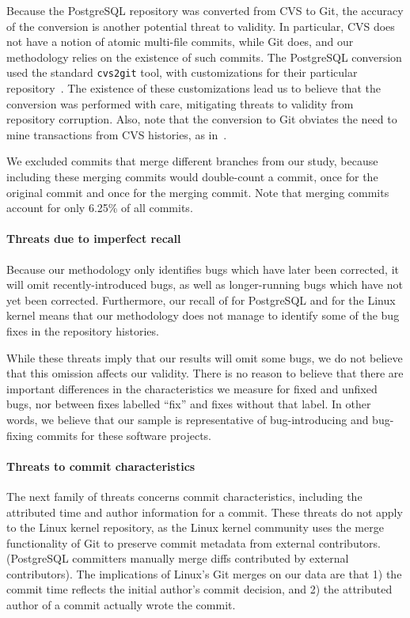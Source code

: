 Because the PostgreSQL repository was converted from CVS to Git, the accuracy of
the conversion is another potential threat to validity. In particular, CVS does
not have a notion of atomic multi-file commits, while Git does, and our
methodology relies on the existence of such commits. The PostgreSQL conversion
used the standard {\tt cvs2git} tool, with customizations for their particular
repository~\cite{haas09:_so_why_postg_using_git}. The existence of these
customizations lead us to believe
that the conversion was performed with care, mitigating threats to
validity from repository corruption. Also, note that the conversion to Git
obviates the need to mine transactions from CVS histories, as
in~\cite{zimmermann-msr-2004}.

We excluded commits that merge different branches from our study, because
including these merging commits would double-count a commit, once for the
original commit and once for the merging commit. Note that merging
commits account for only 6.25\% of all commits.

\paragraph{Threats due to imperfect recall}

Because our methodology only identifies bugs which have later been corrected, it
will omit recently-introduced bugs, as well as longer-running bugs
which have not yet been corrected. Furthermore, our recall of \postR for
PostgreSQL and \linuxR for the Linux kernel means that our methodology does not
manage to identify some of the bug fixes in the repository histories.

While these threats imply that our results will omit some bugs, we do not
believe that this omission affects our validity. There is no reason to believe
that there are important differences in the characteristics we measure for fixed
and unfixed bugs, nor between fixes labelled ``fix'' and fixes without that
label. In other words, we believe that our sample is representative of
bug-introducing and bug-fixing commits for these software projects.

\paragraph{Threats to commit characteristics}

The next family of threats concerns commit characteristics, including the
attributed time and author information for a commit. These threats do not apply
to the Linux kernel repository, as the Linux kernel community uses the merge
functionality of Git to preserve commit metadata from external
contributors. (PostgreSQL committers manually merge diffs
contributed by external contributors). The implications of Linux's Git merges
on our data are that 1) the commit time reflects the initial author's commit
decision, and 2) the attributed author of a commit actually wrote the commit.

